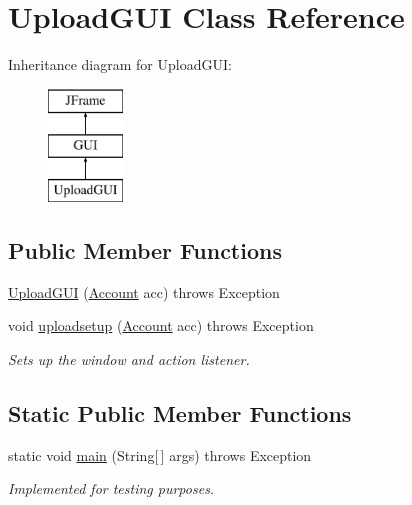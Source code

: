 \hypertarget{class_upload_g_u_i}{}\section{Upload\+G\+UI Class Reference}
\label{class_upload_g_u_i}
Inheritance diagram for Upload\+G\+UI\+:\begin{figure}[H]
\begin{center}
\leavevmode
\includegraphics[height=3.000000cm]{class_upload_g_u_i}
\end{center}
\end{figure}
\subsection*{Public Member Functions}
\begin{DoxyCompactItemize}
\item 
\hyperlink{class_upload_g_u_i_a19f2e3a86156809d4497a210b508ede2}{Upload\+G\+UI} (\hyperlink{class_account}{Account} acc)  throws Exception
\item 
void \hyperlink{class_upload_g_u_i_a4f67dc6bcb1ae96c2b7a148918348075}{uploadsetup} (\hyperlink{class_account}{Account} acc)  throws Exception
\begin{DoxyCompactList}\small\item\em Sets up the window and action listener. \end{DoxyCompactList}\end{DoxyCompactItemize}
\subsection*{Static Public Member Functions}
\begin{DoxyCompactItemize}
\item 
\mbox{\label{class_upload_g_u_i_a01ff7bc7e4b088ed35f11359ef713caa}} 
static void \hyperlink{class_upload_g_u_i_a01ff7bc7e4b088ed35f11359ef713caa}{main} (String\mbox{[}$\,$\mbox{]} args)  throws Exception
\begin{DoxyCompactList}\small\item\em Implemented for testing purposes. \end{DoxyCompactList}\end{DoxyCompactItemize}


